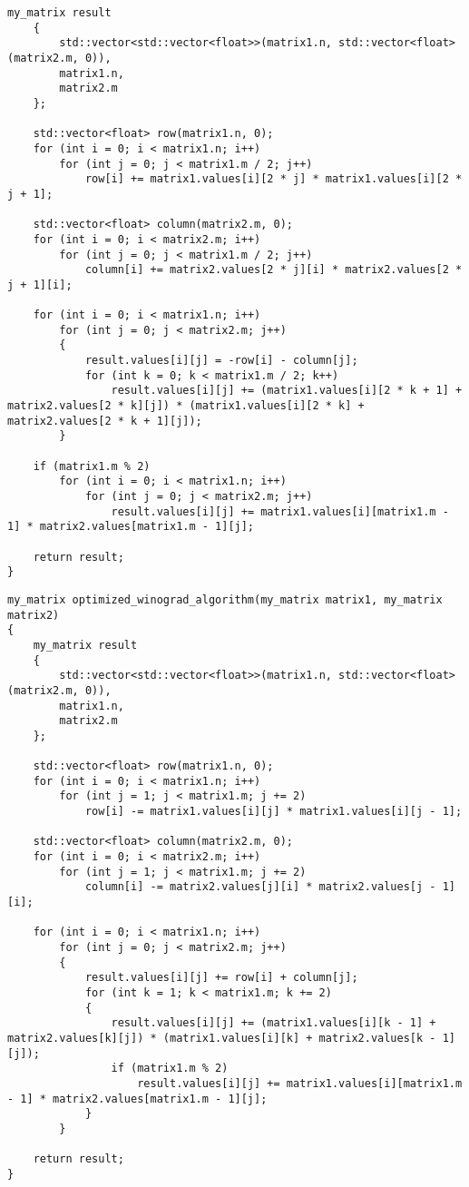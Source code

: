 \newpage
\begin{lstlisting}[label=lst:vin,caption=Алгоритм Винограда]
	my_matrix result
	{
		std::vector<std::vector<float>>(matrix1.n, std::vector<float>(matrix2.m, 0)),
		matrix1.n,
		matrix2.m
	};

	std::vector<float> row(matrix1.n, 0);
	for (int i = 0; i < matrix1.n; i++)
		for (int j = 0; j < matrix1.m / 2; j++)
			row[i] += matrix1.values[i][2 * j] * matrix1.values[i][2 * j + 1];

	std::vector<float> column(matrix2.m, 0);
	for (int i = 0; i < matrix2.m; i++)
		for (int j = 0; j < matrix1.m / 2; j++)
			column[i] += matrix2.values[2 * j][i] * matrix2.values[2 * j + 1][i];

	for (int i = 0; i < matrix1.n; i++)
		for (int j = 0; j < matrix2.m; j++)
		{
			result.values[i][j] = -row[i] - column[j];
			for (int k = 0; k < matrix1.m / 2; k++)
				result.values[i][j] += (matrix1.values[i][2 * k + 1] + matrix2.values[2 * k][j]) * (matrix1.values[i][2 * k] + matrix2.values[2 * k + 1][j]);
		}

	if (matrix1.m % 2)
		for (int i = 0; i < matrix1.n; i++)
			for (int j = 0; j < matrix2.m; j++)
				result.values[i][j] += matrix1.values[i][matrix1.m - 1] * matrix2.values[matrix1.m - 1][j];

	return result;
}
\end{lstlisting}
 
\newpage
  \begin{lstlisting}[label=lst:vin_opt,caption=Оптимизированный алгоритм Винограда]
my_matrix optimized_winograd_algorithm(my_matrix matrix1, my_matrix matrix2)
{
	my_matrix result
	{
		std::vector<std::vector<float>>(matrix1.n, std::vector<float>(matrix2.m, 0)),
		matrix1.n,
		matrix2.m
	};

	std::vector<float> row(matrix1.n, 0);
	for (int i = 0; i < matrix1.n; i++)
		for (int j = 1; j < matrix1.m; j += 2)
			row[i] -= matrix1.values[i][j] * matrix1.values[i][j - 1];

	std::vector<float> column(matrix2.m, 0);
	for (int i = 0; i < matrix2.m; i++)
		for (int j = 1; j < matrix1.m; j += 2)
			column[i] -= matrix2.values[j][i] * matrix2.values[j - 1][i];

	for (int i = 0; i < matrix1.n; i++)
		for (int j = 0; j < matrix2.m; j++)
		{
			result.values[i][j] += row[i] + column[j];
			for (int k = 1; k < matrix1.m; k += 2)
			{
				result.values[i][j] += (matrix1.values[i][k - 1] + matrix2.values[k][j]) * (matrix1.values[i][k] + matrix2.values[k - 1][j]);
				if (matrix1.m % 2)
					result.values[i][j] += matrix1.values[i][matrix1.m - 1] * matrix2.values[matrix1.m - 1][j];
			}
		}

	return result;
}
 \end{lstlisting}


